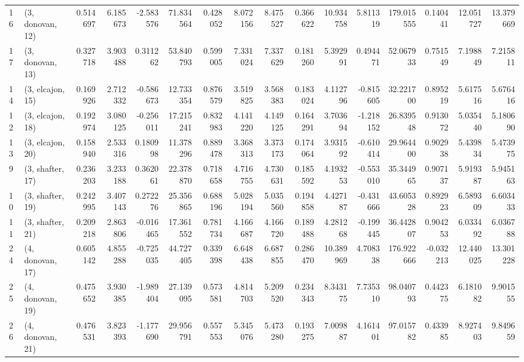 \begin{tabular}{llrrrrrrrrrrrrrr}
16 &  (3, donovan, 12) &   0.514697 &  6.185673 & -2.583576 &  71.834564 &  0.428052 &   8.072156 &  8.475527 &  0.366622 &  10.934758 &  5.811319 &  179.015555 &  0.140441 &  12.051727 &  13.379669 \\
17 &  (3, donovan, 13) &   0.327718 &  3.903488 &  0.311262 &  53.840793 &  0.599005 &   7.331024 &  7.337629 &  0.181260 &   5.392991 &  0.494471 &   52.067933 &  0.751549 &   7.198849 &   7.215811 \\
14 &  (3, elcajon, 15) &   0.169926 &  2.712332 & -0.586673 &  12.733354 &  0.876579 &   3.519825 &  3.568383 &  0.183024 &   4.112796 & -0.815605 &   32.221700 &  0.895219 &   5.617516 &   5.676416 \\
12 &  (3, elcajon, 18) &   0.192974 &  3.080125 & -0.256011 &  17.215241 &  0.832983 &   4.141220 &  4.149125 &  0.164291 &   3.703694 & -1.218152 &   26.839548 &  0.913072 &   5.035440 &   5.180690 \\
13 &  (3, elcajon, 20) &   0.158940 &  2.533316 &  0.180998 &  11.378296 &  0.889478 &   3.368313 &  3.373173 &  0.174064 &   3.931592 & -0.610414 &   29.964400 &  0.902938 &   5.439834 &   5.473975 \\
9  &  (3, shafter, 17) &   0.236203 &  3.233188 &  0.362061 &  22.378870 &  0.718658 &   4.716755 &  4.730631 &  0.185592 &   4.193253 & -0.553010 &   35.344965 &  0.907137 &   5.919387 &   5.945163 \\
10 &  (3, shafter, 19) &   0.242995 &  3.407143 &  0.272276 &  25.356865 &  0.688196 &   5.028194 &  5.035560 &  0.194858 &   4.427187 & -0.431666 &   43.605328 &  0.892923 &   6.589309 &   6.603433 \\
11 &  (3, shafter, 21) &   0.209218 &  2.863806 & -0.016465 &  17.361552 &  0.781734 &   4.166687 &  4.166720 &  0.189488 &   4.281268 & -0.199445 &   36.442807 &  0.904253 &   6.033492 &   6.036788 \\
24 &  (4, donovan, 17) &   0.605142 &  4.855288 & -0.725035 &  44.727405 &  0.339398 &   6.648438 &  6.687855 &  0.286470 &  10.389969 &  4.708338 &  176.922666 & -0.032213 &  12.440025 &  13.301228 \\
25 &  (4, donovan, 19) &   0.475652 &  3.930385 & -1.989404 &  27.139095 &  0.573581 &   4.814703 &  5.209520 &  0.234343 &   8.343175 &  7.735310 &   98.040793 &  0.442375 &   6.181082 &   9.901555 \\
26 &  (4, donovan, 21) &   0.476531 &  3.823393 & -1.177690 &  29.956791 &  0.557553 &   5.345076 &  5.473280 &  0.193275 &   7.009887 &  4.161401 &   97.015782 &  0.433985 &   8.927403 &   9.849659 \\

\end{tabular}
